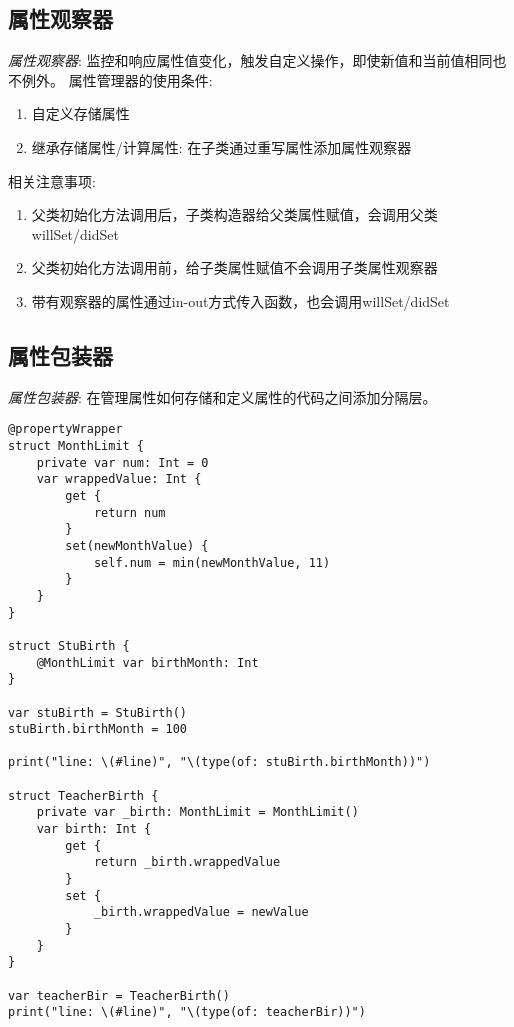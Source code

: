 \documentclass{../main.tex}{subfiles}
\begin{document}
\subsection{属性观察器}
\emph{属性观察器}: 监控和响应属性值变化，触发自定义操作，即使新值和当前值相同也不例外。
属性管理器的使用条件:
\begin{enumerate}[itemsep=0pt, parsep=0pt, topsep=0pt, partopsep=0pt]
    \item 自定义存储属性
    \item 继承存储属性/计算属性: 在子类通过重写属性添加属性观察器
\end{enumerate}
相关注意事项:
\begin{enumerate}[itemsep=0pt, parsep=0pt, topsep=0pt, partopsep=0pt]
    \item 父类初始化方法调用后，子类构造器给父类属性赋值，会调用父类willSet/didSet
    \item 父类初始化方法调用前，给子类属性赋值不会调用子类属性观察器
    \item 带有观察器的属性通过in-out方式传入函数，也会调用willSet/didSet
\end{enumerate}

\subsection{属性包装器}
\emph{属性包装器}: 在管理属性如何存储和定义属性的代码之间添加分隔层。

\begin{lstlisting}[style = lstCodeStyleSwift, caption = {属性包装器基本语法}]
@propertyWrapper
struct MonthLimit {
    private var num: Int = 0
    var wrappedValue: Int {
        get {
            return num
        }
        set(newMonthValue) {
            self.num = min(newMonthValue, 11)
        }
    }
}

struct StuBirth {
    @MonthLimit var birthMonth: Int
}

var stuBirth = StuBirth()
stuBirth.birthMonth = 100

print("line: \(#line)", "\(type(of: stuBirth.birthMonth))")

struct TeacherBirth {
    private var _birth: MonthLimit = MonthLimit()
    var birth: Int {
        get {
            return _birth.wrappedValue
        }
        set {
            _birth.wrappedValue = newValue
        }
    }
}

var teacherBir = TeacherBirth()
print("line: \(#line)", "\(type(of: teacherBir))")

\end{lstlisting}
\end{document}
